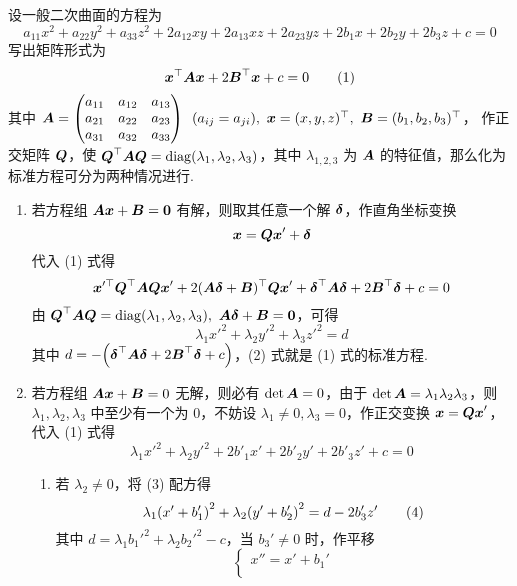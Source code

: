 设一般二次曲面的方程为
$$a_{11}x^2+a_{22}y^2+a_{33}z^2+2a_{12}xy+2a_{13}xz+2a_{23}yz+2b_1x+2b_2y+2b_3z+c=0$$
写出矩阵形式为
\begin{equation*}
    \vb*{x}^\top\vb*{Ax}+2\vb*{B}^\top\vb*{x}+c=0
    \tag{1}
\end{equation*}
其中 $\vb*{A}=\mqty(\xmat*{a}{3}{3})~~(a_{ij}=a_{ji}),~\vb*{x}=(x,y,z)^\top,~\vb*{B}=(b_1,b_2,b_3)^\top$，
作正交矩阵 $\vb*{Q}$，使 $\vb*{Q}^\top\vb*{AQ}=\diag(\lambda_1,\lambda_2,\lambda_3)$，其中 $\lambda_{1,2,3}$ 为 $\vb*{A}$ 的特征值，那么化为标准方程可分为两种情况进行.
\begin{enumerate}[label=(\arabic{*})]
    \item 若方程组 $\vb*{Ax}+\vb*{B}=\vb*{0}$ 有解，则取其任意一个解 $\vb*{\delta}$，作直角坐标变换 $$\vb*{x}=\vb*{Qx}'+\vb*{\delta}$$ 代入 (1) 式得
          $$\vb*{x}'^\top\vb*{Q}^\top\vb*{AQx}'+2(\vb*{A\delta}+\vb*{B})^\top\vb*{Qx}'+\vb*{\delta}^\top\vb*{A\delta}+2\vb*{B}^\top\vb*{\delta}+c=0$$
          由 $\vb*{Q}^\top\vb*{AQ}=\diag(\lambda_1,\lambda_2,\lambda_3),~\vb*{A\delta}+\vb*{B}=\vb*{0}$，可得
          \begin{equation*}
              \lambda_1 x'^2+\lambda_2 y'^2+\lambda_3 z'^2=d
              \tag{2}
          \end{equation*}
          其中 $d=-\qty(\vb*{\delta}^\top\vb*{A\delta}+2\vb*{B}^\top\vb*{\delta}+c)$，(2) 式就是 (1) 式的标准方程.
    \item 若方程组 $\vb*{Ax}+\vb*{B}=0$ 无解，则必有 $\det\vb*{A}=0$，由于 $\det\vb*{A}=\lambda_1\lambda_2\lambda_3$，则 $\lambda_1,\lambda_2,\lambda_3$ 中至少有一个为 0，不妨设 $\lambda_1\neq 0,\lambda_3=0$，作正交变换 $\vb*{x}=\vb*{Qx}'$，代入 (1) 式得
          \begin{equation*}
              \lambda_1x'^2+\lambda_2y'^2+2b'_1x'+2b'_2y'+2b'_3z'+c=0
              \tag{3}
          \end{equation*}
          \begin{enumerate}[label=(\roman{*})]
              \item 若 $\lambda_2\neq0$，将 (3) 配方得
                    \begin{equation*}
                        \lambda_1\qty(x'+b_1')^2+\lambda_2\qty(y'+b_2')^2=d-2b_3'z'
                        \tag{4}
                    \end{equation*}
                    其中 $d=\lambda_1b_1'^2+\lambda_2b_2'^2-c$，当 $b_3'\neq0$ 时，作平移 $$\begin{cases}
                            x''=x'+b_1' \\

\end{cases}$$
\end{enumerate}
\end{enumerate}
